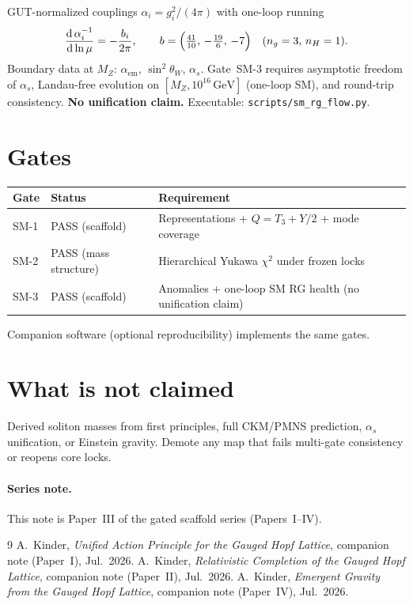 \documentclass[11pt]{article}
\begin{document}
GUT-normalized couplings $\alpha_i=g_i^2/(4\pi)$ with one-loop running
\begin{equation}
\frac{\mathrm{d}\,\alpha_i^{-1}}{\mathrm{d}\ln\mu}
= -\frac{b_i}{2\pi},
\qquad
b=\Bigl(\tfrac{41}{10},\,-\tfrac{19}{6},\,-7\Bigr)
\quad (n_g=3,\,n_H=1).
\label{eq:rg}
\end{equation}
Boundary data at $M_Z$: $\alpha_{\mathrm{em}}$, $\sin^2\theta_W$, $\alpha_s$.
Gate~SM-3 requires asymptotic freedom of $\alpha_s$, Landau-free evolution on
$[M_Z,10^{16}\,\mathrm{GeV}]$ (one-loop SM), and round-trip consistency.
\textbf{No unification claim.} Executable: \texttt{scripts/sm\_rg\_flow.py}.

\section{Gates}

\begin{center}
\begin{tabular}{@{}llp{}@{}}
\hline
Gate & Status & Requirement \\
\hline
SM-1 & PASS (scaffold) & Representations + $Q=T_3+Y/2$ + mode coverage \\
SM-2 & PASS (mass structure) & Hierarchical Yukawa $\chi^2$ under frozen locks \\
SM-3 & PASS (scaffold) & Anomalies + one-loop SM RG health (no unification claim) \\
\hline
\end{tabular}
\end{center}

Companion software (optional reproducibility) implements the same gates.

\section{What is not claimed}

Derived soliton masses from first principles, full CKM/PMNS prediction,
$\alpha_s$ unification, or Einstein gravity. Demote any map that fails multi-gate
consistency or reopens core locks.

\paragraph{Series note.}
This note is Paper~III of the gated scaffold series (Papers~I--IV).

\begin{thebibliography}{9}
A.~Kinder, \emph{Unified Action Principle for the Gauged Hopf Lattice},
companion note (Paper~I), Jul.~2026.
A.~Kinder, \emph{Relativistic Completion of the Gauged Hopf Lattice},
companion note (Paper~II), Jul.~2026.
A.~Kinder, \emph{Emergent Gravity from the Gauged Hopf Lattice},
companion note (Paper~IV), Jul.~2026.
\end{thebibliography}
\end{document}
